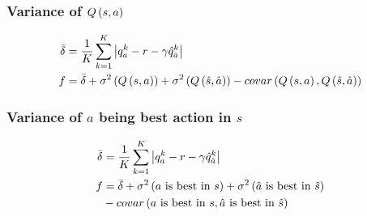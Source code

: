 \documentclass[10pt]{article}
\begin{document}
\subsubsection{Variance of $\func[Q]{s,a}$}

\begin{align}
	\bar{\delta} & = \frac{1}{K}\sum_{k=1}^{K} \left| q_a^k - r - \gamma \hat{q}^k_{\hat{a}} \right|                                                                       \\
	f            & = \bar{\delta} + \func[\sigma^2]{\func[Q]{s,a}} + \func[\sigma^2]{\func[Q]{\hat{s}, \hat{a}}} - \func[covar]{\func[Q]{s,a}, \func[Q]{\hat{s}, \hat{a}}}
\end{align}

\subsubsection{Variance of $a$ being best action in $s$}

\begin{align}
	\bar{\delta} & = \frac{1}{K}\sum_{k=1}^{K} \left| q_a^k - r - \gamma \hat{q}^k_{\hat{a}} \right|                              \\
	f            & = \bar{\delta} + \func[\sigma^2]{a\text{ is best in } s} + \func[\sigma^2]{\hat{a}\text{ is best in } \hat{s}} \\
	             & - \func[covar]{a\text{ is best in } s, \hat{a}\text{ is best in } \hat{s}}
\end{align}
\end{document}

